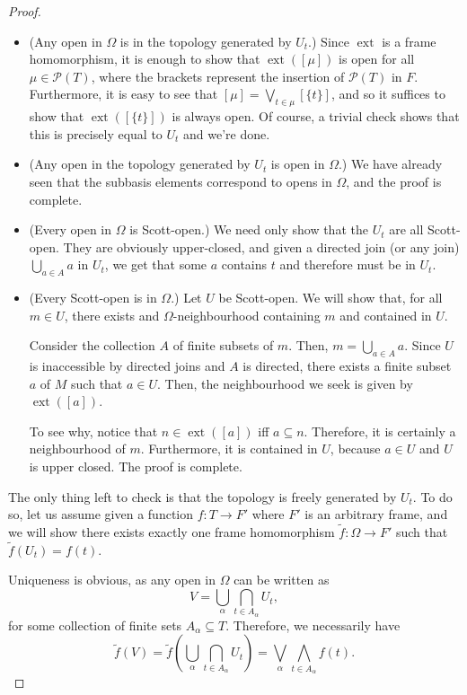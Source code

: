 \documentclass{article}
\theoremstyle{definition}
\theoremstyle{plain}
\DeclareMathOperator{\ext}{ext}
\newcommand{\ps}{\mathcal{P}}
\begin{document}
\begin{proof}\leavevmode
\begin{itemize}
\item (Any open in $\Omega$ is in the topology generated by $U_{t}$.) Since $\ext$ is a frame homomorphism, it is enough to show that $\ext([\mu])$ is open for all $\mu \in \ps(T)$, where the brackets represent the insertion of $\ps(T)$ in $F$. Furthermore, it is easy to see that $[\mu] = \bigvee_{t \in \mu} [\{t\}]$, and so it suffices to show that $\ext([\{t\}])$ is always open. Of course, a trivial check shows that this is precisely equal to $U_{t}$ and we're done.

\item (Any open in the topology generated by $U_{t}$ is open in $\Omega$.) We have already seen that the subbasis elements correspond to opens in $\Omega$, and the proof is complete.

\item (Every open in $\Omega$ is Scott-open.) We need only show that the $U_{t}$ are all Scott-open. They are obviously upper-closed, and given a directed join (or any join) $\bigcup_{a \in A} a$ in  $U_{t}$, we get that some $a$ contains $t$ and therefore must be in $U_{t}$.

\item (Every Scott-open is in $\Omega$.) Let $U$ be Scott-open. We will show that, for all $m \in U$, there exists and $\Omega$-neighbourhood containing $m$ and contained in $U$.

Consider the collection $A$ of finite subsets of $m$. Then, $m = \bigcup_{a \in A} a$. Since $U$ is inaccessible by directed joins and $A$ is directed, there exists a finite subset $a$ of $M$ such that $a \in U$. Then, the neighbourhood we seek is given by $\ext([a])$.

To see why, notice that $n \in \ext([a])$ iff $a \subseteq n$. Therefore, it is certainly a neighbourhood of $m$. Furthermore, it is contained in $U$, because $a \in U$ and $U$ is upper closed. The proof is complete.
\end{itemize}

The only thing left to check is that the topology is freely generated by $U_{t}$. To do so, let us assume given a function $f : T \to F'$ where $F'$ is an arbitrary frame, and we will show there exists exactly one frame homomorphism $\tilde f : \Omega \to F'$ such that $\tilde f(U_t) = f(t)$.

Uniqueness is obvious, as any open in $\Omega$ can be written as
\[V = \bigcup_\alpha \bigcap_{t \in A_\alpha} U_t,\]
for some collection of finite sets $A_\alpha \subseteq T$. Therefore, we necessarily have
\begin{equation}\label{freehomdef}
\tilde f(V) = \tilde f\left(\bigcup_\alpha \bigcap_{t \in A_\alpha} U_t\right) = \bigvee_{\alpha} \bigwedge_{t \in A_\alpha} f(t).
\end{equation}


\end{proof}
\end{document}
